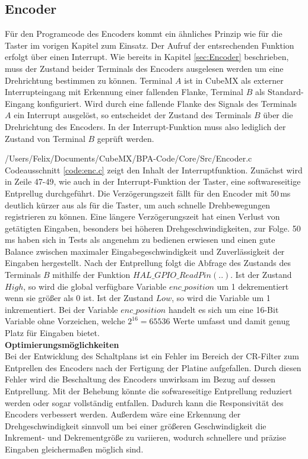 
\subsection{Encoder}
Für den Programcode des Encoders kommt ein ähnliches Prinzip wie für die Taster im vorigen Kapitel zum Einsatz. Der Aufruf der entsrechenden Funktion erfolgt über einen Interrupt.
Wie bereits in Kapitel \ref{sec:Encoder} beschrieben, muss der Zustand beider Terminals des Encoders ausgelesen werden um eine Drehrichtung bestimmen zu können. Terminal $A$ ist in CubeMX als externer Interrupteingang mit Erkennung einer fallenden Flanke, Terminal $B$ als Standard-Eingang konfiguriert. Wird durch eine fallende Flanke des Signals des Terminals $A$ ein Interrupt ausgelöst, so entscheidet der Zustand des Terminals $B$ über die Drehrichtung des Encoders. In der Interrupt-Funktion muss also lediglich der Zustand von Terminal $B$ geprüft werden. 

{/Users/Felix/Documents/CubeMX/BPA-Code/Core/Src/Encoder.c}
Codeausschnitt \ref{code:enc.c} zeigt den Inhalt der Interruptfunktion. Zunächst wird in Zeile 47-49, wie auch in der Interrupt-Funktion der Taster, eine softwareseitige Entprellug durchgeführt. Die Verzögerungszeit fällt für den Encoder mit 50\,ms deutlich kürzer aus als für die Taster, um auch schnelle Drehbewegungen registrieren zu können. Eine längere Verzögerungszeit hat einen Verlust von getätigten Eingaben, besonders bei höheren Drehgeschwindigkeiten, zur Folge. 50\,ms haben sich in Tests als angenehm zu bedienen erwiesen und einen gute Balance zwischen maximaler Eingabegeschwindigkeit und Zuverlässigkeit der Eingaben hergestellt.
Nach der Entprellung folgt die Abfrage des Zustands des Terminals $B$ mithilfe der Funktion $HAL\_GPIO\_ReadPin(..)$. Ist der Zustand $High$, so wird die global verfügbare Variable $enc\_position$ um 1 dekrementiert wenn sie größer als 0 ist. Ist der Zustand $Low$, so wird die Variable um 1 inkrementiert. Bei der Variable $enc\_position$ handelt es sich um eine 16-Bit Variable ohne Vorzeichen, welche $2^{16} = 65536$ Werte umfasst und damit genug Platz für Eingaben bietet.\\
\textbf{Optimierungsmöglichkeiten}\\
Bei der Entwicklung des Schaltplans ist ein Fehler im Bereich der CR-Filter zum Entprellen des Encoders nach der Fertigung der Platine aufgefallen. Durch diesen Fehler wird die Beschaltung des Encoders unwirksam im Bezug auf dessen Entprellung. Mit der Behebung könnte die sofwareseitige Entprellung reduziert werden oder sogar vollständig entfallen. Dadurch kann die Responsivität des Encoders verbessert werden.
Außerdem wäre eine Erkennung der Drehgeschwindigkeit sinnvoll um bei einer größeren Geschwindigkeit die Inkrement- und Dekrementgröße zu variieren, wodurch schnellere und präzise Eingaben gleichermaßen möglich sind.